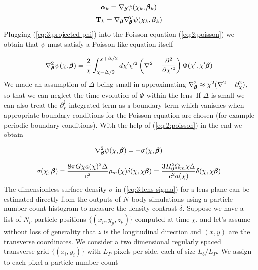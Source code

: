 \begin{equation}
\label{eq:3:alphak-psi}
\pmb{\alpha}_k = \nabla_{\pmb{\beta}}\psi(\chi_k,\pmb{\beta}_k)
\end{equation}
%
\begin{equation}
\label{eq:3:Tk-psi}
\mathbf{T}_k = \nabla_{\pmb{\beta}}\nabla^T_{\pmb{\beta}}\psi(\chi_k,\pmb{\beta}_k)
\end{equation}
%
Plugging (\ref{eq:3:projected-phi}) into the Poisson equation (\ref{eq:2:poisson}) we obtain that $\psi$ must satisfy a Poisson-like equation itself

\begin{equation}
\label{eq:3:poisson-psi-1}
\nabla^2_{\pmb{\beta}}\psi(\chi,\pmb{\beta}) = \frac{2}{\chi}\int_{\chi-\Delta/2}^{\chi+\Delta/2}d\chi' \chi'^2\left(\nabla^2-\frac{\partial^2}{\partial \chi'^2}\right)\Phi(\chi',\chi'\pmb{\beta})
\end{equation}
%
We made an assumption of $\Delta$ being small in approximating $\nabla^2_{\pmb{\beta}}\approx \chi^2(\nabla^2-\partial_\chi^2)$, so that we can neglect the time evolution of $\Phi$ within the lens. If $\Delta$ is small we can also treat the $\partial^2_\chi$ integrated term as a boundary term which vanishes when appropriate boundary conditions for the Poisson equation are chosen (for example periodic boundary conditions). With the help of (\ref{eq:2:poisson}) in the end we obtain

\begin{equation}
\label{eq:3:poisson-psi-2}
\nabla^2_{\pmb{\beta}}\psi(\chi,\pmb{\beta}) = -\sigma(\chi,\pmb{\beta})  
\end{equation} 

\begin{equation}
\label{eq:3:lens-sigma}
\sigma(\chi,\pmb{\beta}) = \frac{8\pi G \chi a(\chi)^2\Delta}{c^2}\bar{\rho}_m(\chi)\delta(\chi,\chi\pmb{\beta}) = \frac{3H_0^2\Omega_m\chi\Delta}{c^2 a(\chi)}\delta(\chi,\chi\pmb{\beta})
\end{equation}
%
The dimensionless surface density $\sigma$ in (\ref{eq:3:lens-sigma}) for a lens plane can be estimated directly from the outputs of $N$--body simulations using a particle number count histogram to measure the density contrast $\delta$. Suppose we have a list of $N_p$ particle positions $\{(x_p,y_p,z_p)\}$ computed at time $\chi$, and let's assume without loss of generality that $z$ is the longitudinal direction and $(x,y)$ are the transverse coordinates. We consider a two dimensional regularly spaced transverse grid $\{(x_i,y_i)\}$ with $L_P$ pixels per side, each of size $L_b/L_P$. We assign to each pixel a particle number count

